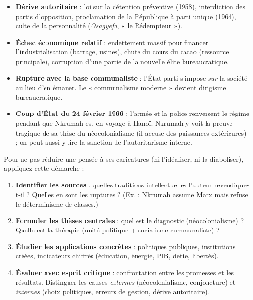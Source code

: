 \documentclass[11pt]{article}
\begin{document}
\begin{itemize}
    \item \textbf{Dérive autoritaire} : loi sur la détention préventive (1958), interdiction des partis d'opposition, proclamation de la République à parti unique (1964), culte de la personnalité (\emph{Osagyefo}, « le Rédempteur »).
    \item \textbf{Échec économique relatif} : endettement massif pour financer l'industrialisation (barrage, usines), chute du cours du cacao (ressource principale), corruption d'une partie de la nouvelle élite bureaucratique.
    \item \textbf{Rupture avec la base communaliste} : l'État-parti s'impose \emph{sur} la société au lieu d'en émaner. Le « communalisme moderne » devient dirigisme bureaucratique.
    \item \textbf{Coup d'État du 24 février 1966} : l'armée et la police renversent le régime pendant que Nkrumah est en voyage à Hanoï. Nkrumah y voit la preuve tragique de sa thèse du néocolonialisme (il accuse des puissances extérieures) ; on peut aussi y lire la sanction de l'autoritarisme interne.
\end{itemize}

\begin{methode}
Pour ne pas réduire une pensée à ses caricatures (ni l'idéaliser, ni la diaboliser), appliquez cette démarche :
\begin{enumerate}
    \item \textbf{Identifier les sources} : quelles traditions intellectuelles l'auteur revendique-t-il ? Quelles en sont les ruptures ? (Ex. : Nkrumah assume Marx mais refuse le déterminisme de classes.)
    \item \textbf{Formuler les thèses centrales} : quel est le diagnostic (néocolonialisme) ? Quelle est la thérapie (unité politique + socialisme communaliste) ?
    \item \textbf{Étudier les applications concrètes} : politiques publiques, institutions créées, indicateurs chiffrés (éducation, énergie, PIB, dette, libertés).
    \item \textbf{Évaluer avec esprit critique} : confrontation entre les promesses et les résultats. Distinguer les causes \emph{externes} (néocolonialisme, conjoncture) et \emph{internes} (choix politiques, erreurs de gestion, dérive autoritaire).
\end{enumerate}
\end{methode}
\end{document}
